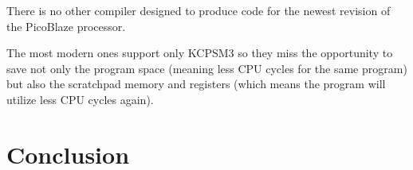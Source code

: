     There is no other compiler designed to produce code for the newest revision of the PicoBlaze processor.

    The most modern ones support only KCPSM3 so they miss the opportunity to save not only the program space (meaning less CPU cycles for the same program) but also the scratchpad memory and registers (which means the program will utilize less CPU cycles again).

\chapter{Conclusion}\label{conclusion}


\cite{TBD}
